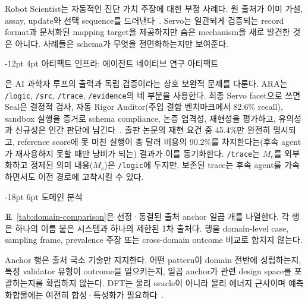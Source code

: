 \documentclass[11pt]{article}
\makeatletter
\renewcommand\section{\@startsection{section}{1}{\z@}%
  {-18pt \@plus -4pt \@minus -2pt}%
  {6pt \@plus 2pt}%
  {\normalfont\large\bfseries}}
\renewcommand\subsection{\@startsection{subsection}{2}{\z@}%
  {-12pt \@plus -2pt \@minus -2pt}%
  {4pt \@plus 1pt}%
  {\normalfont\normalsize\bfseries}}
\makeatother
\begin{document}
Robot Scientist는 자동적인 진단 가치 주장에 대한 부정 사례다. 원 출처가 이미 가설, assay, update와 선택 sequence를 드러낸다~\citep{king2004robot,sparkes2010robot}. Servo는 일관되게 검증되는 record format과 문서화된 mapping target을 제공하지만 숨은 mechanism을 새로 발견한 것은 아니다. 사례들은 schema가 무엇을 전면화하는지만 보여준다.

\subsection{아티팩트 인프라: 에이전트 네이티브 연구 아티팩트}
\label{sec:ara}

\citet{liu2026lasthuman}은 AI 과학자 루프의 출력과 독립 검증이라는 상호 보완적 문제를 다룬다. ARA는 \texttt{/logic}, \texttt{/src}, \texttt{/trace}, \texttt{/evidence}의 네 부분을 사용한다. 최종 Servo facet으로 쓰면 Seal은 결정적 검사, 자동 Rigor Auditor(주입 결함 벤치마크에서 82.6\% recall), sandbox 실행을 증거로 schema compliance, 논증 엄격성, 재현성을 평가하고, 유의성과 신규성은 인간 판단에 남긴다~\citep{liu2026lasthuman}. 출판 논문의 재현 요건 중 45.4\%만 완전히 명시되고, reference score에 못 미친 실행이 총 달러 비용의 90.2\%를 차지한다는(후속 agent가 재사용하지 못할 때만 낭비가 되는) 결과가 이를 동기화한다. \texttt{/trace}는 $M_e$를 외부화하고 정제된 의미 내용($M_s$)은 \texttt{/logic}에 두지만, 보존된 trace는 후속 agent를 가속하면서도 이전 경로에 고착시킬 수 있다.

\section{도메인 분석}
\label{sec:domains}

표~\ref{tab:domain-comparison}은 선정·동결된 출처 anchor 일곱 개를 나열한다. 각 행은 하나의 이름 붙은 시스템과 하나의 제한된 1차 출처다. 행을 domain-level case, sampling frame, prevalence 주장 또는 cross-domain outcome 비교로 합치지 않는다.

\begin{table}[h]
\centering
\footnotesize
\setlength{\tabcolsep}{4pt}

\caption{선정·동결된 출처 anchor 일곱 개. 이 행은 이름 붙은 경계에서 어휘를 구체화하는 방법만 보여주며 대표 domain 표본이나 공통 outcome 척도가 아니다.}
\label{tab:domain-comparison}
\end{table}

\noindent Anchor 행은 출처 국소 기술만 지지한다. 어떤 pattern이 domain 전반에 성립하는지, 특정 validator 유형이 outcome을 일으키는지, 일곱 anchor가 관련 design space를 포괄하는지를 확립하지 않는다. DFT는 물리 oracle이 아니라 물리 에너지 근사이며 예측 화합물에는 여전히 합성·특성화가 필요하다~\citep{cheetham2024gnome}.
\end{document}
